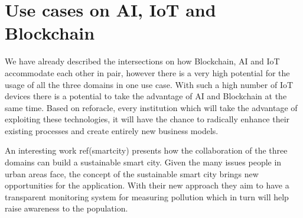  
 
 
 \section{Use cases on AI, IoT and Blockchain}
 
 We have already described the intersections on how Blockchain, AI and IoT accommodate each other in pair, however there is a very high potential for the usage of all the three domains in one use case. With such a high number of IoT devices there is a potential to take the advantage of AI and Blockchain at the same time. Based on reforacle, every institution  which will take the advantage of exploiting these technologies, it will have the chance to radically enhance their existing processes and create entirely new business models. 
 
An interesting work ref(smartcity)  presents how the collaboration of the three domains can build a sustainable smart city. Given the many issues people in urban areas face, the concept of the sustainable smart city brings new opportunities for the application. With their new approach they aim to have a transparent monitoring system for measuring pollution which in turn will help raise awareness to the population. 


